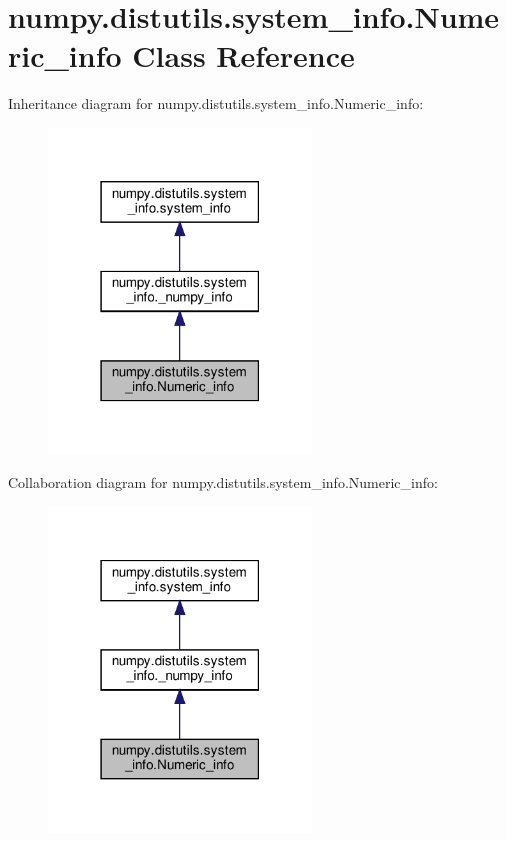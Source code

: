 \hypertarget{classnumpy_1_1distutils_1_1system__info_1_1Numeric__info}{}\section{numpy.\+distutils.\+system\+\_\+info.\+Numeric\+\_\+info Class Reference}
\label{classnumpy_1_1distutils_1_1system__info_1_1Numeric__info}


Inheritance diagram for numpy.\+distutils.\+system\+\_\+info.\+Numeric\+\_\+info\+:
\nopagebreak
\begin{figure}[H]
\begin{center}
\leavevmode
\includegraphics[width=198pt]{classnumpy_1_1distutils_1_1system__info_1_1Numeric__info__inherit__graph}
\end{center}
\end{figure}


Collaboration diagram for numpy.\+distutils.\+system\+\_\+info.\+Numeric\+\_\+info\+:
\nopagebreak
\begin{figure}[H]
\begin{center}
\leavevmode
\includegraphics[width=198pt]{classnumpy_1_1distutils_1_1system__info_1_1Numeric__info__coll__graph}
\end{center}
\end{figure}
